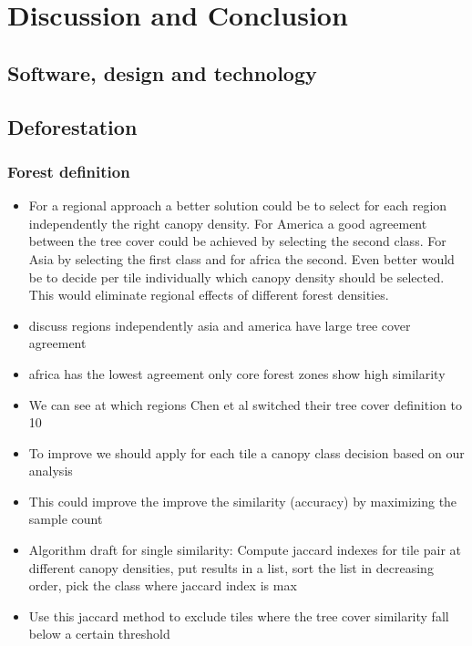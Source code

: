 \chapter{Discussion and Conclusion}
\label{ch:discussion}

	\section{Software, design and technology}

	\section{Deforestation}
	\label{sec:discussion_deforestation}

		\subsection{Forest definition}
		\label{subsec:discussion_forest_definition}
			\begin{itemize}
				\item For a regional approach a better solution could be to select for each region independently the right canopy density. For America a good agreement between the tree cover could be achieved by selecting the second class. For Asia by selecting the first class and for africa the second. Even better would be to decide per tile individually which canopy density should be selected. This would eliminate regional effects of different forest densities.
				\item discuss regions independently asia and america have large tree cover agreement
				\item africa has the lowest agreement only core forest zones show high similarity
				\item We can see at which regions Chen et al switched their tree cover definition to 10
				\item To improve we should apply for each tile a canopy class decision based on our analysis
				\item This could improve the improve the similarity (accuracy) by maximizing the sample count
				\item Algorithm draft for single similarity: Compute jaccard indexes for tile pair at different canopy densities, put results in a list, sort the list in decreasing order, pick the class where jaccard index is max
				\item Use this jaccard method to exclude tiles where the tree cover similarity fall below a certain threshold
			\end{itemize}

